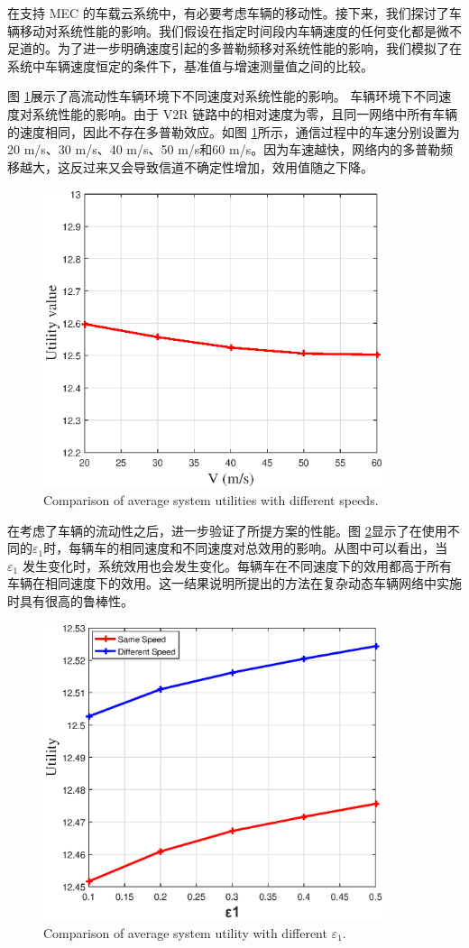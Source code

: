 在支持 MEC 的车载云系统中，有必要考虑车辆的移动性。接下来，我们探讨了车辆移动对系统性能的影响。我们假设在指定时间段内车辆速度的任何变化都是微不足道的。为了进一步明确速度引起的多普勒频移对系统性能的影响，我们模拟了在系统中车辆速度恒定的条件下，基准值与增速测量值之间的比较。

图 \ref{F5}展示了高流动性车辆环境下不同速度对系统性能的影响。
车辆环境下不同速度对系统性能的影响。由于 V2R 链路中的相对速度为零，且同一网络中所有车辆的速度相同，因此不存在多普勒效应。如图 \ref{F5}所示，通信过程中的车速分别设置为20 m/s、30 m/s、40 m/s、50 m/s和60 m/s。因为车速越快，网络内的多普勒频移越大，这反过来又会导致信道不确定性增加，效用值随之下降。
\begin{figure}[H]
\centering
\includegraphics[width=10cm]{figures//chap3//diffspeed1.eps}
\caption{Comparison of average system utilities with different speeds.}
\label{F5}
\end{figure}

在考虑了车辆的流动性之后，进一步验证了所提方案的性能。图 \ref{F6}显示了在使用不同的$\varepsilon_1$时，每辆车的相同速度和不同速度对总效用的影响。从图中可以看出，当 $\varepsilon_1$ 发生变化时，系统效用也会发生变化。每辆车在不同速度下的效用都高于所有车辆在相同速度下的效用。这一结果说明所提出的方法在复杂动态车辆网络中实施时具有很高的鲁棒性。
\begin{figure}[H]
\centering
\includegraphics[width=10cm]{figures//chap3//diff_e1.eps}
\caption{Comparison of average system utility with different $\varepsilon_1$.}
\label{F6}
\end{figure}

